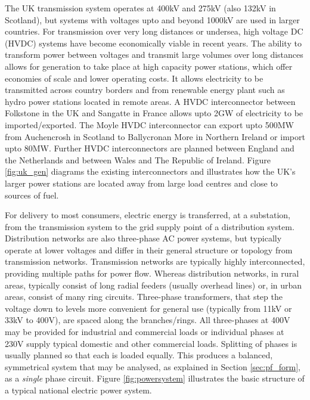 The UK transmission system operates at 400kV and 275kV (also 132kV in
Scotland), but systems with voltages upto and beyond 1000kV are used in
larger countries.  For transmission over very long distances or
undersea, high voltage DC (HVDC) systems have become economically viable in
recent years.  The ability to
transform power between voltages and transmit large volumes over long
distances allows for generation to take place at high capacity power stations,
which offer economies of scale and lower operating costs. It allows electricity to
be transmitted across country borders and from renewable energy plant such as
hydro power stations located in remote areas.  A HVDC interconnector between
Folkstone in the UK and Sangatte in France allows upto 2GW of
electricity to be imported/exported.  The Moyle HVDC interconnector can export
upto 500MW from Auchencrosh in Scotland to Ballycronan More in Northern
Ireland or import upto 80MW.  Further HVDC interconnectors are planned between
England and the Netherlands and between Wales and The Republic of Ireland.
Figure \ref{fig:uk_gen} diagrams the existing interconnectors and illustrates
how the UK's larger power stations are located away from large load centres and
close to sources of fuel.



For delivery to most consumers, electric energy is transferred, at a
substation, from the transmission system to the grid supply point of a distribution
system.  Distribution networks are also three-phase AC power systems, but
typically operate at lower voltages and differ in their general
structure or topology from transmission networks.  Transmission networks are
typically highly interconnected, providing multiple paths for power flow.
Whereas distribution networks, in rural areas, typically consist of long radial
feeders (usually overhead lines) or, in urban areas, consist of many ring
circuits.  Three-phase transformers, that step the voltage down to levels
more convenient for general use (typically from 11kV or 33kV to 400V), are
spaced along the branches/rings. All three-phases at 400V may be provided for
industrial and commercial loads or individual phases at 230V supply typical
domestic and other commercial loads. Splitting of phases is usually planned so
that each is loaded equally. This produces a balanced, symmetrical system that
may be analysed, as explained in Section \ref{sec:pf_form}, as a
\textit{single} phase circuit.  Figure \ref{fig:powersystem} illustrates the
basic structure of a typical national electric power system.

